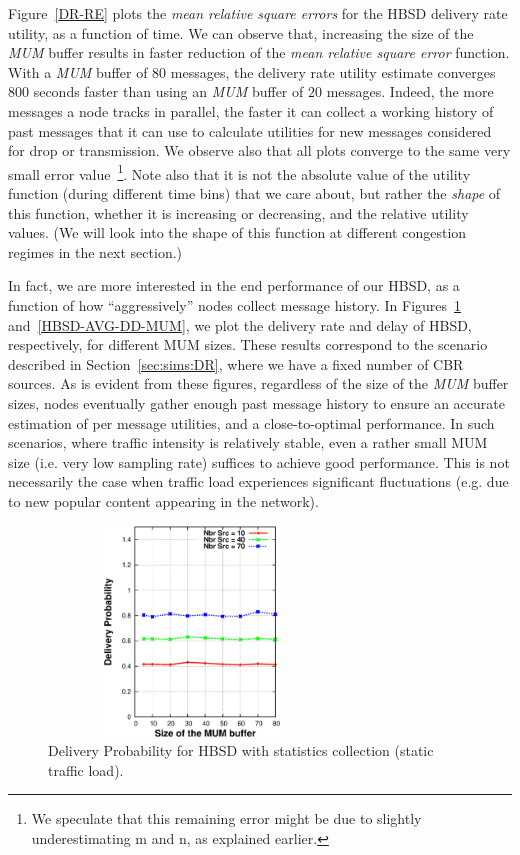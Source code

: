 Figure~\ref{DR-RE} plots the \emph{mean relative square errors} for the HBSD delivery rate utility, as a function of time. We can observe that, increasing the size of the \emph{MUM} buffer results in faster reduction of the \emph{mean relative square error} function. With a \emph{MUM} buffer of $80$ messages, the delivery rate utility estimate converges $800$ seconds faster than using an \emph{MUM} buffer of $20$ messages. Indeed, the more messages a node tracks in parallel, the faster it can collect a working history of past messages that it can use to calculate utilities for new messages considered for drop or transmission. We observe also that all plots converge to the same very small error value~\footnote{We speculate that this remaining error might be due to slightly underestimating m and n, as explained earlier.}. Note also that it is not the absolute value of the utility function (during different time bins) that we care about, but rather the \emph{shape} of this function, whether it is increasing or decreasing, and the relative utility values. (We will look into the shape of this function at different congestion regimes in the next section.)

In fact, we are more interested in the end performance of our HBSD, as a function of how ``aggressively'' nodes collect message history. In Figures~\ref{HBSD-AVG-DR-MUM} and~\ref{HBSD-AVG-DD-MUM}, we plot the delivery rate and delay of HBSD, respectively, for different MUM sizes. These results correspond to the scenario described in Section~\ref{sec:sims:DR}, where we have a fixed number of CBR sources. As is evident from these figures, regardless of the size of the \emph{MUM} buffer sizes, nodes eventually gather enough past message history to ensure an accurate estimation of per message utilities, and a close-to-optimal performance. In such scenarios, where traffic intensity is relatively stable, even a rather small MUM size (i.e. very low sampling rate) suffices to achieve good performance. This is not necessarily the case when traffic load experiences significant fluctuations (e.g. due to new popular content appearing in the network).

\begin{figure}[!h]
  \begin{center}
    \includegraphics[width=3in,height=2.2in]{Chapitre3/fig13.eps}
  \end{center}
  \caption{Delivery Probability for HBSD with statistics collection (static traffic load).}
  \label{HBSD-AVG-DR-MUM}
\end{figure}

